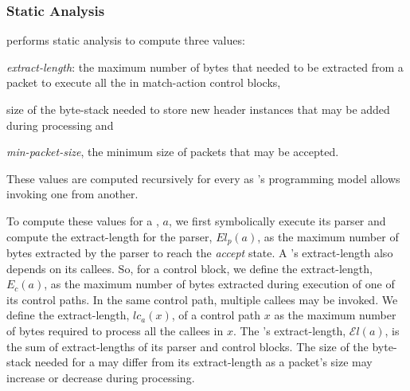 \documentclass[letterpaper,twocolumn,10pt]{article}
\begin{document}
\subsubsection{Static Analysis}
\label{subsubsection:static-analysis}
\ucomp performs static analysis to compute three values:
\begin{enumerate*}[label=(\roman*)]
  \item \emph{extract-length}: the maximum number of bytes that needed
    to be extracted from a packet to execute all the \uprograms in
    match-action control blocks,
  \item size of the byte-stack needed to store new header instances
    that may be added during processing and
  \item \emph{min-packet-size}, the minimum size of packets that may
    be accepted.
\end{enumerate*}
These values are computed recursively for every \uprogram as
\uswitch's programming model allows invoking one \uprogram from
another.

To compute these values for a \uprogram, $a$, we first symbolically
execute its parser and compute the extract-length for the parser,
$El_{p}(a)$, as the maximum number of bytes extracted by the parser to
reach the \textit{accept} state. A \uprogram's extract-length also
depends on its callees. So, for a control block, we define the
extract-length, $E_{c}(a)$, as the maximum number of bytes extracted
during execution of one of its control paths. In the same control
path, multiple callees may be invoked. We define the extract-length,
$lc_{a}(x)$, of a control path $x$ as the maximum number of bytes
required to process all the callees in $x$. The \uprogram's
extract-length, $\mathcal{E}l(a)$, is the sum of extract-lengths of
its parser and control blocks. The size of the byte-stack needed for a
\uprogram may differ from its extract-length as a packet's size may
increase or decrease during processing.

\end{document}

